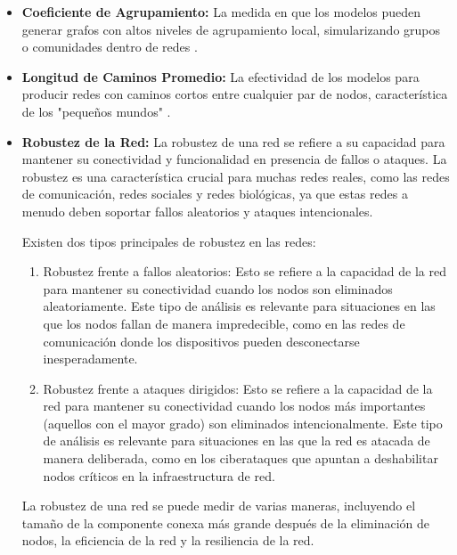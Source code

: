 \begin{itemize}
    \item \textbf{Coeficiente de Agrupamiento:} La medida en que los modelos pueden generar grafos con altos niveles de agrupamiento local, simularizando grupos o comunidades dentro de redes .
    \item \textbf{Longitud de Caminos Promedio:} La efectividad de los modelos para producir redes con caminos cortos entre cualquier par de nodos, característica de los "pequeños mundos" .
    \item \textbf{Robustez de la Red:} La robustez de una red se refiere a su capacidad para mantener su conectividad y funcionalidad en presencia de fallos o ataques. La robustez es una característica crucial para muchas redes reales, como las redes de comunicación, redes sociales y redes biológicas, ya que estas redes a menudo deben soportar fallos aleatorios y ataques intencionales.

    Existen dos tipos principales de robustez en las redes:
    
    \begin{enumerate}
        \item Robustez frente a fallos aleatorios: Esto se refiere a la capacidad de la red para mantener su conectividad cuando los nodos son eliminados aleatoriamente. Este tipo de análisis es relevante para situaciones en las que los nodos fallan de manera impredecible, como en las redes de comunicación donde los dispositivos pueden desconectarse inesperadamente.
        \item Robustez frente a ataques dirigidos: Esto se refiere a la capacidad de la red para mantener su conectividad cuando los nodos más importantes (aquellos con el mayor grado) son eliminados intencionalmente. Este tipo de análisis es relevante para situaciones en las que la red es atacada de manera deliberada, como en los ciberataques que apuntan a deshabilitar nodos críticos en la infraestructura de red.
    \end{enumerate}
    La robustez de una red se puede medir de varias maneras, incluyendo el tamaño de la componente conexa más grande después de la eliminación de nodos, la eficiencia de la red y la resiliencia de la red.
    
\end{itemize}


